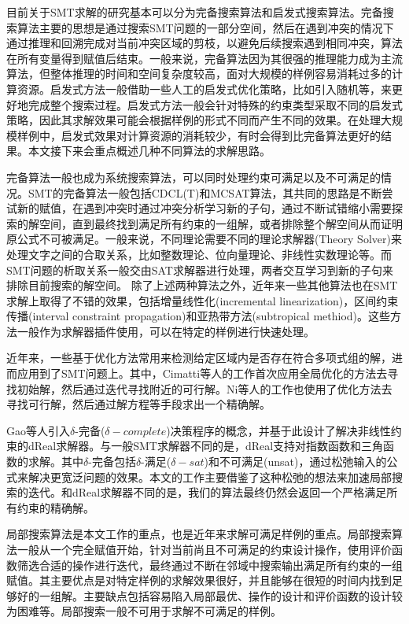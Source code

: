 目前关于SMT求解的研究基本可以分为完备搜索算法和启发式搜索算法。完备搜索算法主要的思想是通过搜索SMT问题的一部分空间，然后在遇到冲突的情况下通过推理和回溯完成对当前冲突区域的剪枝，以避免后续搜索遇到相同冲突，算法在所有变量得到赋值后结束。一般来说，完备算法因为其很强的推理能力成为主流算法，但整体推理的时间和空间复杂度较高，面对大规模的样例容易消耗过多的计算资源。启发式方法一般借助一些人工的启发式优化策略，比如引入随机等，来更好地完成整个搜索过程。启发式方法一般会针对特殊的约束类型采取不同的启发式策略，因此其求解效果可能会根据样例的形式不同而产生不同的效果。在处理大规模样例中，启发式效果对计算资源的消耗较少，有时会得到比完备算法更好的结果。本文接下来会重点概述几种不同算法的求解思路。

完备算法一般也成为系统搜索算法，可以同时处理约束可满足以及不可满足的情况。SMT的完备算法一般包括CDCL(T)\cite{NieuwenhuisOT06}和MCSAT算法\cite{JovanovicM12,MouraJ13}，其共同的思路是不断尝试新的赋值，在遇到冲突时通过冲突分析学习新的子句，通过不断试错缩小需要探索的解空间，直到最终找到满足所有约束的一组解，或者排除整个解空间从而证明原公式不可被满足。一般来说，不同理论需要不同的理论求解器(Theory Solver)来处理文字之间的合取关系，比如整数理论、位向量理论、非线性实数理论等。而SMT问题的析取关系一般交由SAT求解器进行处理，两者交互学习到新的子句来排除目前搜索的解空间。
除了上述两种算法之外，近年来一些其他算法也在SMT求解上取得了不错的效果，包括增量线性化(incremental linearization)\cite{Incremental2}，区间约束传播(interval constraint propagation)\cite{KhanhO12,TungKO17}和亚热带方法(subtropical methiod)\cite{FontaineOSV17,NalbachA23}。这些方法一般作为求解器插件使用，可以在特定的样例进行快速处理。

近年来，一些基于优化方法常用来检测给定区域内是否存在符合多项式组的解，进而应用到了SMT问题上。其中，Cimatti等人的工作\cite{CimattiGLS22}首次应用全局优化的方法去寻找初始解，然后通过迭代寻找附近的可行解。Ni等人的工作也使用了优化方法去寻找可行解\cite{NiWX23}，然后通过解方程\cite{LiXZ23b}等手段求出一个精确解。

Gao等人引入$\delta$-完备($\delta-complete$)决策程序的概念，并基于此设计了解决非线性约束的dReal求解器。与一般SMT求解器不同的是，dReal支持对指数函数和三角函数的求解。其中$\delta$-完备包括$\delta$-满足($\delta-sat$)和不可满足(unsat)，通过松弛输入的公式来解决更宽泛问题的效果。本文的工作主要借鉴了这种松弛的想法来加速局部搜索的迭代。和dReal求解器不同的是，我们的算法最终仍然会返回一个严格满足所有约束的精确解。

局部搜索算法是本文工作的重点，也是近年来求解可满足样例的重点。局部搜索算法一般从一个完全赋值开始，针对当前尚且不可满足的约束设计操作，使用评价函数筛选合适的操作进行迭代，最终通过不断在邻域中搜索输出满足所有约束的一组赋值。其主要优点是对特定样例的求解效果很好，并且能够在很短的时间内找到足够好的一组解。主要缺点包括容易陷入局部最优、操作的设计和评价函数的设计较为困难等。局部搜索一般不可用于求解不可满足的样例。
